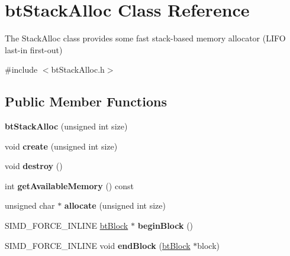 \hypertarget{classbt_stack_alloc}{\section{bt\+Stack\+Alloc Class Reference}
\label{classbt_stack_alloc}
}


The Stack\+Alloc class provides some fast stack-\/based memory allocator (L\+I\+F\+O last-\/in first-\/out)  




{\ttfamily \#include $<$bt\+Stack\+Alloc.\+h$>$}

\subsection*{Public Member Functions}
\begin{DoxyCompactItemize}
\item 
\hypertarget{classbt_stack_alloc_aa1f1da74e2983e8f5e3b41228caf3e8d}{{\bfseries bt\+Stack\+Alloc} (unsigned int size)}\label{classbt_stack_alloc_aa1f1da74e2983e8f5e3b41228caf3e8d}

\item 
\hypertarget{classbt_stack_alloc_a7458509926cd6c3e30ce01b8b46741aa}{void {\bfseries create} (unsigned int size)}\label{classbt_stack_alloc_a7458509926cd6c3e30ce01b8b46741aa}

\item 
\hypertarget{classbt_stack_alloc_a1d8b2c69a0f38538adbe8f6193d38218}{void {\bfseries destroy} ()}\label{classbt_stack_alloc_a1d8b2c69a0f38538adbe8f6193d38218}

\item 
\hypertarget{classbt_stack_alloc_abf01d64c7021d0dc46554d07aff520eb}{int {\bfseries get\+Available\+Memory} () const }\label{classbt_stack_alloc_abf01d64c7021d0dc46554d07aff520eb}

\item 
\hypertarget{classbt_stack_alloc_a88484bf546396b0832589913dedcfe67}{unsigned char $\ast$ {\bfseries allocate} (unsigned int size)}\label{classbt_stack_alloc_a88484bf546396b0832589913dedcfe67}

\item 
\hypertarget{classbt_stack_alloc_ae8e4baf11b0efda337b30e4c79ae354f}{S\+I\+M\+D\+\_\+\+F\+O\+R\+C\+E\+\_\+\+I\+N\+L\+I\+N\+E \hyperlink{structbt_block}{bt\+Block} $\ast$ {\bfseries begin\+Block} ()}\label{classbt_stack_alloc_ae8e4baf11b0efda337b30e4c79ae354f}

\item 
\hypertarget{classbt_stack_alloc_a684a3696b6ac56a6316b7e4f6b64c3a3}{S\+I\+M\+D\+\_\+\+F\+O\+R\+C\+E\+\_\+\+I\+N\+L\+I\+N\+E void {\bfseries end\+Block} (\hyperlink{structbt_block}{bt\+Block} $\ast$block)}\label{classbt_stack_alloc_a684a3696b6ac56a6316b7e4f6b64c3a3}

\end{DoxyCompactItemize}


